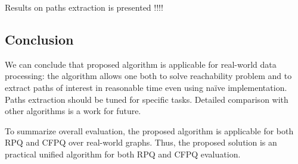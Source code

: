 Results on paths extraction is presented !!!!

\subsection{Conclusion}

We can conclude that proposed algorithm is applicable for real-world data processing: the algorithm allows one both to solve reachability problem and to extract paths of interest in reasonable time even using na{\"i}ve implementation.
Paths extraction should be tuned for specific tasks.
Detailed comparison with other algorithms is a work for future.

To summarize overall evaluation, the proposed algorithm is applicable for both RPQ and CFPQ over real-world graphs. 
Thus, the proposed solution is an practical unified algorithm for both RPQ and CFPQ evaluation.

